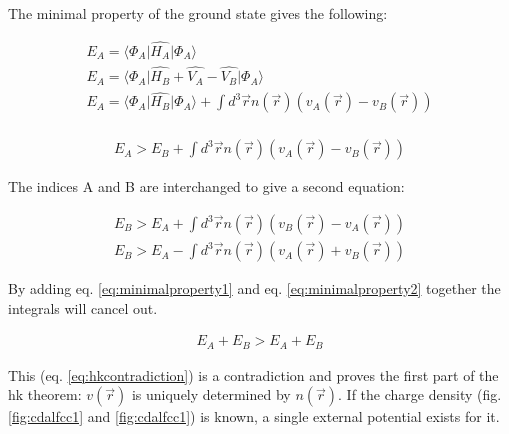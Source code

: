 The minimal property of the ground state gives the following\cite{hohenbergkohn}\cite{hohenbergkohnleeuwen}:

\begin{equation}
\begin{split}
E_A = \langle \Phi_A \lvert \hat{H_A} \rvert \Phi_A \rangle \\
E_A = \langle \Phi_A \lvert \hat{H_B} + \hat{V_A} - \hat{V_B} \rvert \Phi_A \rangle \\
E_A = \langle \Phi_A \lvert \hat{H_B} \rvert \Phi_A \rangle + \int d^3 \vec{r} n(\vec{r})(v_A(\vec{r}) - v_B(\vec{r})) \\
\end{split}
\label{eq:minimalproperty}
\end{equation}

\begin{equation}
\begin{split}
E_A > E_B + \int d^3 \vec{r} n(\vec{r})(v_A(\vec{r}) - v_B(\vec{r}))
\end{split}
\label{eq:minimalproperty1}
\end{equation}

The indices A and B are interchanged to give a second equation:

\begin{equation}
\begin{split}
E_B > E_A + \int d^3 \vec{r} n(\vec{r})(v_B(\vec{r}) - v_A(\vec{r})) \\
E_B > E_A - \int d^3 \vec{r} n(\vec{r})(v_A(\vec{r}) + v_B(\vec{r}))
\end{split}
\label{eq:minimalproperty2}
\end{equation}

By adding eq. \ref{eq:minimalproperty1} and eq. \ref{eq:minimalproperty2} together the integrals will cancel out.

\begin{equation}
\begin{split}
E_A + E_B > E_A + E_B
\end{split}
\label{eq:hkcontradiction}
\end{equation}

This (eq. \ref{eq:hkcontradiction}) is a contradiction and proves the first part of the \acrshort{hk} theorem: $v(\vec{r})$ is uniquely determined by $n(\vec{r})$.  If the charge density (fig. \ref{fig:cdalfcc1} and \ref{fig:cdalfcc1}) is known, a single external potential exists for it.

